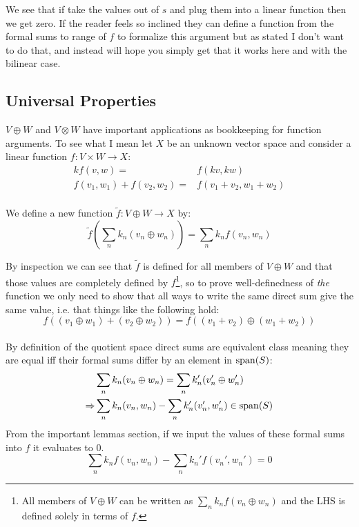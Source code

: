 We see that if take the values out of $s$ and plug them into a linear function then we get zero.
If the reader feels so inclined they can define a function from the formal sums to range of $f$ to formalize this argument but as stated I don't want to do that,
and instead will hope you simply get that it works here and with the bilinear case.

\subsection{Universal Properties}
$V\oplus W$ and $V\otimes W$ have important applications as bookkeeping for function arguments.
To see what I mean let $X$ be an unknown vector space and consider a linear function $f:V\times W \rightarrow X$:
\begin{equation*}
\begin{aligned}
	kf(v,w) =& f(kv,kw)\\
	f(v_1,w_1)+f(v_2,w_2) =& f(v_1+v_2,w_1+w_2)\\
\end{aligned}
\end{equation*}

We define a new function $\tilde{f}:V\oplus W \rightarrow X$ by:
\[\tilde{f}\left(\sum_nk_n(v_n\oplus w_n)\right) = \sum_nk_nf(v_n,w_n)\]

By inspection we can see that $\tilde{f}$ is defined for all members of $V\oplus W$ and that those values are completely defined by $f$\footnote{All members of $V\oplus W$ can be written as $\sum_nk_nf(v_n\oplus w_n)$ and the LHS is defined solely in terms of $f$.},
so to prove well-definedness of {\em the} function we only need to show that all ways to write the same direct sum give the same value, i.e. that things like the following hold:
\[f((v_1\oplus w_1)+(v_2\oplus w_2)) = f((v_1+v_2)\oplus (w_1+w_2))\]
\\

By definition of the quotient space direct sums are equivalent class meaning they are equal iff their formal sums differ by an element in $\operatorname{span}(S)$:
\begin{equation*}
\begin{aligned}
	&\sum_nk_n(v_n\oplus w_n) = \sum_nk_n'(v_n'\oplus w_n')\\
	\Rightarrow&\sum_nk_n(v_n,w_n) - \sum_nk_n'(v_n',w_n') \in \operatorname{span}(S)\\
\end{aligned}
\end{equation*}
From the important lemmas section, 
if we input the values of these formal sums into $f$ it evaluates to $0$.
\[\sum_nk_nf(v_n,w_n) - \sum_nk_n'f(v_n',w_n') = 0 \]


